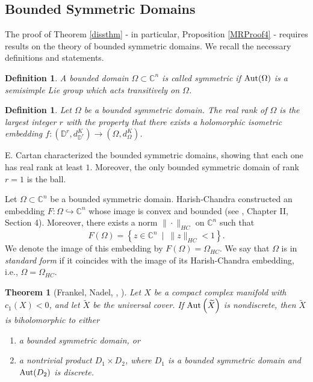 \documentclass[12pt]{article}
\newcommand{\C}{\mathbb{C}}
\newcommand{\D}{\mathbb{D}}
\newcommand{\Aut}{\textup{Aut}}
\newtheorem{theorem}[lemma]{Theorem}
\newtheorem{defnition}[lemma]{Definition}
\newenvironment{definition}{\begin{defnition} \em}{\end{defnition}}
\begin{document}
\subsection{Bounded Symmetric Domains}

The proof of Theorem \ref{dissthm} - in particular, Proposition \ref{MRProof4} - requires results on the theory of bounded symmetric domains. We recall the necessary definitions and statements.

\begin{definition}
\label{symmetricdomaindef}
A bounded domain $\Omega\subset\C^n$ is called \textit{symmetric} if $\Aut(\Omega)$ is a semisimple Lie group which acts transitively on $\Omega$.
\end{definition}

\begin{definition}
Let $\Omega$ be a bounded symmetric domain. The \textit{real rank of $\Omega$} is the largest integer $r$ with the property that there exists a holomorphic isometric embedding $f:(\D^r,d^K_{\D^r})\to(\Omega,d^K_{\Omega})$.
\end{definition}

E. Cartan \cite{Cartan} characterized the bounded symmetric domains, showing that each one has real rank at least $1$. Moreover, the only bounded symmetric domain of rank $r=1$ is the ball.

Let $\Omega\subset\C^n$ be a bounded symmetric domain. Harish-Chandra constructed an embedding $F:\Omega\hookrightarrow\C^n$ whose image is convex and bounded (see \cite{Satake}, Chapter II, Section 4). Moreover, there exists a norm $\|\cdot\|_{HC}$ on $\C^n$ such that
\[
F(\Omega)=\left\{z\in\C^n \ \mid \ \|z\|_{HC}<1\right\}.
\]
We denote the image of this embedding by $F(\Omega)=\Omega_{HC}$. We say that $\Omega$ is in \textit{standard form} if it coincides with the image of its Harish-Chandra embedding, i.e., $\Omega=\Omega_{HC}$.

\begin{theorem}[Frankel, Nadel, \cite{Frankel}, \cite{Nadel}]
\label{FNSymmetric}
Let $X$ be a compact complex manifold with $c_1(X)<0$, and let $\widetilde{X}$ be the universal cover. If $\Aut\left(\widetilde{X}\right)$ is nondiscrete, then $\widetilde{X}$ is biholomorphic to either
\begin{enumerate}
    \item[(a)] a bounded symmetric domain, or
    \item[(b)] a nontrivial product $D_1\times D_2$, where $D_1$ is a bounded symmetric domain and $\Aut(D_2)$ is discrete.
\end{enumerate}
\end{theorem}
\end{document}
